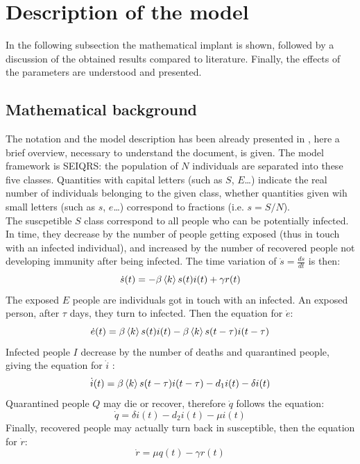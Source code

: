 
\section{Description of the model}
\label{sec:model}

In the following subsection the mathematical implant is shown, followed by a discussion of the obtained results compared to literature. Finally, the effects of the parameters are understood and presented.

\subsection{Mathematical background}
\label{ssec:math}
The notation and the model description has been already presented in \cite{MingLiu}, here a brief overview, necessary to understand the document, is given. The model framework is SEIQRS: the population of $N$ individuals are separated into these five classes. Quantities with capital letters (such as $S$, $E$\dots) indicate the real number of individuals belonging to the given class, whether quantities given wih small letters (such as $s$, $e$\dots) correspond to fractions (i.e. $s = S/N$). \\

The suscpetible $S$ class correspond to all people who can be potentially infected. In time, they decrease by the number of people getting exposed (thus in touch with an infected individual), and increased by the number of recovered people not developing immunity after being infected. The time variation of $\dot{s} = \frac{ds}{dt}$ is then:
\begin{equation}
\dot{s} (t)= -\beta\braket{k}s(t)i(t)+\gamma{r(t)} 
\end{equation} 
The exposed $E$ people are individuals got in touch with an infected. An exposed person, after $\tau$ days, they turn to infected. Then the equation for $\dot{e}$:
\begin{equation}
\dot{e} (t)= \beta\braket{k}s(t)i(t) - \beta\braket{k}s(t-\tau)i(t-\tau) 
\end{equation} 
Infected people $I$ decrease by the number of deaths and quarantined people, giving the equation for $\dot{i}$ :
\begin{equation}
\dot{i} (t)= \beta\braket{k}s(t-\tau)i(t-\tau) - d_1i(t) - \delta {i(t)}
\label{eqn:idot}
\end{equation} 
Quarantined people $Q$ may die or recover, therefore $\dot{q}$ follows the equation:
\begin{equation}
\dot{q} = \delta{i(t)} - d_2{i(t)} - \mu{i(t)}
\end{equation}
Finally, recovered people may actually turn back in susceptible, then the equation for $\dot{r}$:
\begin{equation}
\dot{r} = \mu{q(t)}-\gamma{r(t)}
\end{equation}

